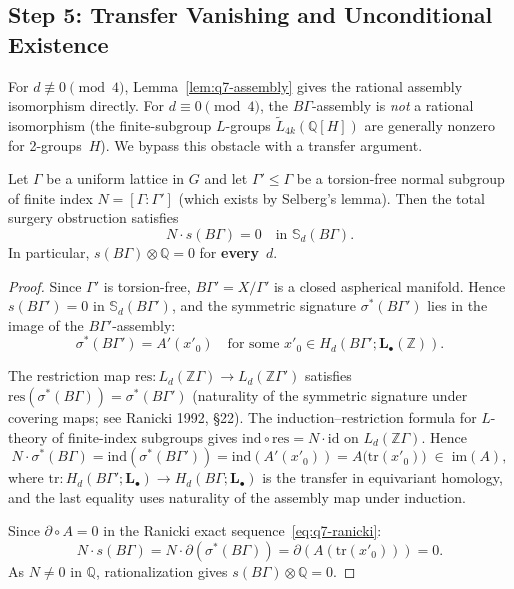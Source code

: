 \subsection*{Step 5: Transfer Vanishing and Unconditional Existence}

For $d\not\equiv 0\pmod{4}$, Lemma~\ref{lem:q7-assembly} gives the
rational assembly isomorphism directly.  For $d\equiv 0\pmod{4}$,
the $B\Gamma$-assembly is \emph{not} a rational isomorphism
(the finite-subgroup $L$-groups $\widetilde L_{4k}(\mathbb Q[H])$ are
generally nonzero for 2-groups~$H$).
We bypass this obstacle with a transfer argument.

\begin{lemma}\label{lem:q7-transfer}
Let $\Gamma$ be a uniform lattice in $G$ and let
$\Gamma'\le\Gamma$ be a torsion-free normal subgroup of finite index
$N=[\Gamma:\Gamma']$ (which exists by Selberg's lemma).
Then the total surgery obstruction satisfies
\[
N\cdot s(B\Gamma)=0\quad\text{in }
\mathbb S_d(B\Gamma).
\]
In particular, $s(B\Gamma)\otimes\mathbb Q=0$ for \textbf{every}~$d$.
\end{lemma}

\begin{proof}
Since $\Gamma'$ is torsion-free, $B\Gamma'=X/\Gamma'$ is a closed
aspherical manifold.  Hence $s(B\Gamma')=0$ in $\mathbb S_d(B\Gamma')$,
and the symmetric signature $\sigma^*(B\Gamma')$ lies in the image of
the $B\Gamma'$-assembly:
\[
\sigma^*(B\Gamma')=A'(x'_0)
\quad\text{for some }
x'_0\in H_d(B\Gamma';\mathbf L_\bullet(\mathbb Z)).
\]

The restriction map $\mathrm{res}\colon L_d(\mathbb Z\Gamma)\to
L_d(\mathbb Z\Gamma')$ satisfies
$\mathrm{res}(\sigma^*(B\Gamma))=\sigma^*(B\Gamma')$
(naturality of the symmetric signature under covering maps;
see Ranicki 1992, \S22).
The induction--restriction formula for $L$-theory of finite-index subgroups gives
$\mathrm{ind}\circ\mathrm{res}=N\cdot\mathrm{id}$ on
$L_d(\mathbb Z\Gamma)$.  Hence
\[
N\cdot\sigma^*(B\Gamma)
=\mathrm{ind}(\sigma^*(B\Gamma'))
=\mathrm{ind}(A'(x'_0))
=A\bigl(\mathrm{tr}(x'_0)\bigr)
\;\in\; \mathrm{im}(A),
\]
where $\mathrm{tr}\colon H_d(B\Gamma';\mathbf L_\bullet)
\to H_d(B\Gamma;\mathbf L_\bullet)$ is the transfer in equivariant
homology, and the last equality uses naturality of the assembly map
under induction.

Since $\partial\circ A=0$ in the Ranicki exact sequence~\eqref{eq:q7-ranicki}:
\[
N\cdot s(B\Gamma)
=N\cdot\partial(\sigma^*(B\Gamma))
=\partial(A(\mathrm{tr}(x'_0)))
=0.
\]
As $N\ne 0$ in $\mathbb Q$, rationalization gives
$s(B\Gamma)\otimes\mathbb Q=0$.
\end{proof}

